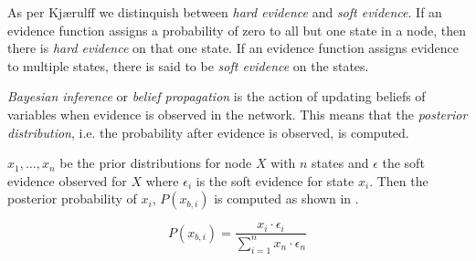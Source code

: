 As per Kjærulff \etal\cite[pp. 23-24]{kjaerulff2008bayesian} we distinquish between \emph{hard evidence} and \emph{soft evidence}. If an evidence function assigns a probability of zero to all but one state in a node, then there is \emph{hard evidence} on that one state. If an evidence function assigns evidence to multiple states, there is said to be \emph{soft evidence} on the states.

\emph{Bayesian inference} or \emph{belief propagation} is the action of updating beliefs of variables when evidence is observed in the network. This means that the \emph{posterior distribution}, i.e. the probability after evidence is observed, is computed.

$x_1,\ldots,x_n$ be the prior distributions for node $X$ with $n$ states and $\epsilon$ the soft evidence observed for $X$ where $\epsilon_i$ is the soft evidence for state $x_i$. Then the posterior probability of $x_i$, $P(x_{b,i})$ is computed as shown in .

\begin{equation}
\label{eq:analysis:bayesian-network:soft-evidence}
P(x_{b,i}) = \frac{x_i \cdot \epsilon_i}{\sum\limits_{i=1}^n x_n \cdot \epsilon_n}
\end{equation}









